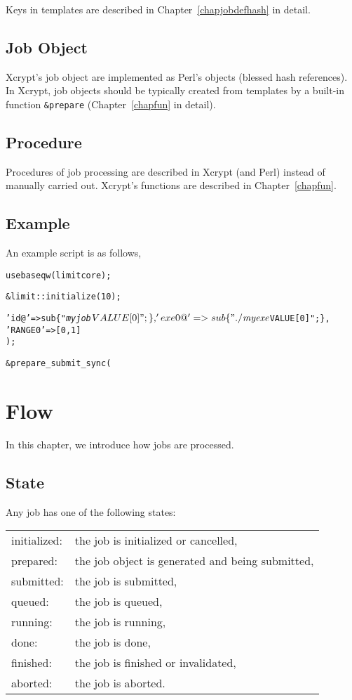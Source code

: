 \documentclass[a4paper,10pt]{report}
\begin{document}
Keys in templates are described in Chapter~\ref{chapjobdefhash} in
detail.

\section{Job Object}

Xcrypt's job object are implemented as Perl's objects (blessed hash
references).  In Xcrypt, job objects should be typically created from
templates by a built-in function \texttt{\&prepare}
(Chapter~\ref{chapfun} in detail).


\section{Procedure}

Procedures of job processing are described in Xcrypt (and Perl)
instead of manually carried out.
Xcrypt's functions are described in Chapter~\ref{chapfun}.

\section{Example}\label{secscriptexample}

An example script is as follows,
\begin{boxnote}
\begin{alltt}
use base qw(limit core);

&limit::initialize(10);

%mytemplate = (
 'id@' => sub \{ "\textit{myjob}$VALUE[0]"; \},
 'exe0@' => sub \{ "./\textit{myexe} $VALUE[0]"; \},
 'RANGE0' => [0,1]
);

&prepare_submit_sync(%mytemplate);
\end{alltt}
\end{boxnote}


\chapter{Flow}

In this chapter, we introduce how jobs are processed.

\section{State}\label{sec:states}

Any job has one of the following states:
\begin{center}
\begin{tabular}{ll}
initialized: & the job is initialized or cancelled,\\
prepared: & the job object is generated and being submitted,\\
submitted: & the job is submitted,\\
queued: & the job is queued,\\
running: & the job is running,\\
done: & the job is done,\\
finished: & the job is finished or invalidated,\\
aborted: & the job is aborted.
\end{tabular}
\end{center}
\end{document}
